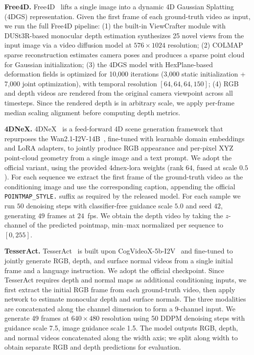 \noindent 
\textbf{Free4D.}
Free4D~\citep{liu2025free4d} lifts a single image into a dynamic 4D Gaussian Splatting (4DGS) representation. Given the first frame of each ground-truth video as input, we run the full Free4D pipeline: (1) the built-in ViewCrafter module with DUSt3R-based monocular depth estimation synthesizes 25 novel views from the input image via a video diffusion model at $576 \times 1024$ resolution; (2) COLMAP sparse reconstruction estimates camera poses and produces a sparse point cloud for Gaussian initialization; (3) the 4DGS model with HexPlane-based deformation fields is optimized for 10{,}000 iterations (3{,}000 static initialization + 7{,}000 joint optimization), with temporal resolution $[64, 64, 64, 150]$; (4) RGB and depth videos are rendered from the original camera viewpoint across all timesteps. Since the rendered depth is in arbitrary scale, we apply per-frame median scaling alignment before computing depth metrics.                                            

\noindent 
\textbf{4DNeX.}
4DNeX~\citep{chen20254dnex} is a feed-forward 4D scene generation framework that repurposes the Wan2.1-I2V-14B~\citep{wang2025wan}, fine-tuned with learnable domain embeddings and LoRA adapters, to jointly produce RGB appearance and per-pixel XYZ point-cloud geometry from a single image and a text prompt. We adopt the official variant, using the provided 4dnex-lora weights (rank $64$, fused at scale $0.5$).   
For each sequence we extract the first frame of the ground-truth video as the conditioning image and use the corresponding caption, appending the official \texttt{POINTMAP\_STYLE.} suffix as required by the released model. For each sample we run $50$ denoising steps with classifier-free guidance scale $5.0$ and seed $42$, generating $49$ frames at $24$~fps. We obtain the depth video by taking the $z$-channel of the predicted pointmap, min--max normalized per sequence to $[0, 255]$. 

\noindent 
\textbf{TesserAct.}
TesserAct~\citep{zhen2025learning} is built upon CogVideoX-5b-I2V~\citep{yang2024cogvideox} and fine-tuned to jointly generate RGB, depth, and surface normal videos from a single initial frame and a language instruction. We adopt the official  checkpoint. Since TesserAct requires depth and normal maps as additional conditioning inputs, we first extract the initial RGB frame from each ground-truth video, then apply network to estimate monocular depth and surface normals. The three modalities are concatenated along the channel dimension to form a 9-channel input. We generate 49 frames at $640\times480$ resolution using 50 DDPM denoising steps with guidance scale 7.5, image guidance scale 1.5. The model outputs RGB, depth, and normal videos concatenated along the width axis; we split along width to obtain separate RGB and depth predictions for evaluation. 


